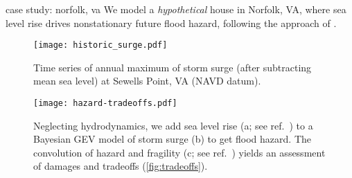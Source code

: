 \begin{block}{case study: norfolk, va}
    We model a \emph{hypothetical} house in Norfolk, VA, where sea level rise drives nonstationary future flood hazard, following the approach of \cite{zarekarizi_suboptimal:2020}.
    \begin{figure}
        \centering
        \texttt{[image: historic\_surge.pdf]}
        \caption{
            Time series of annual maximum of storm surge (after subtracting mean sea level) at Sewells Point, VA (NAVD datum).
        }
        \label{fig:observations}
    \end{figure}
    \begin{figure}
        \centering
        \texttt{[image: hazard-tradeoffs.pdf]}
        \caption{
            Neglecting hydrodynamics, we add sea level rise (a; see ref.~\cite{ruckert_coastal:2019}) to a Bayesian GEV model of storm surge (b) to get flood hazard.
            The convolution of hazard and fragility (c; see ref.~\cite{zarekarizi_suboptimal:2020}) yields an assessment of damages and tradeoffs (\cref{fig:tradeoffs}).
        }
    \end{figure}
\end{block}